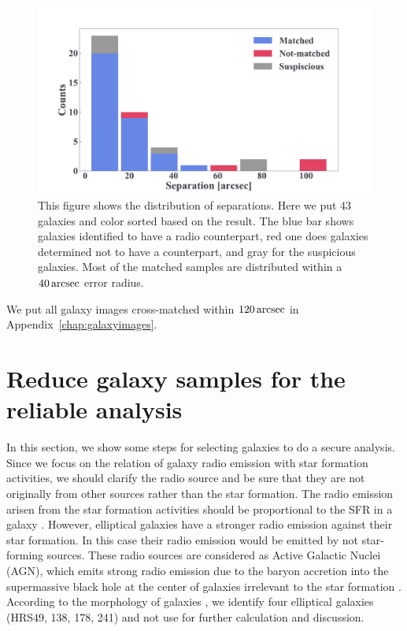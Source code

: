 \begin{figure}[htbp]
	\centering
	\includegraphics[width=.8\linewidth]{Chapter_4/Figures/Method_separation.pdf}
    \caption[Separation from the cross-matching]{\label{fig:separation}
        This figure shows the distribution of separations.
        Here we put 43 galaxies and color sorted based on the result.
        The blue bar shows galaxies identified to have a radio counterpart, red one does galaxies determined not to have a counterpart, and gray for the suspicious galaxies.
        Most of the matched samples are distributed within a $40\,\mathrm{arcsec}$ error radius.
    }
\end{figure}

We put all galaxy images cross-matched within $120\,\mathrm{arcsec}$ in Appendix~\ref{chap:galaxyimages}.



\section{Reduce galaxy samples for the reliable analysis}\label{sec:reducegalaxysamples}

In this section, we show some steps for selecting galaxies to do a secure analysis.
Since we focus on the relation of galaxy radio emission with star formation activities, we should clarify the radio source and be sure that they are not originally from other sources rather than the star formation.
The radio emission arisen from the star formation activities should be proportional to the SFR in a galaxy \citep{Condon1992a, Murphy2011}.
However, elliptical galaxies have a stronger radio emission against their star formation.
In this case their radio emission would be emitted by not star-forming sources.
These radio sources are considered as Active Galactic Nuclei (AGN), which emits strong radio emission due to the baryon accretion into the supermassive black hole at the center of galaxies irrelevant to the star formation \citep[e.g.,][]{Urry1995, Padovani2017}.
According to the morphology of galaxies \citep{Cortese2012}, we identify four elliptical galaxies (HRS49, 138, 178, 241) and not use for further calculation and discussion.

